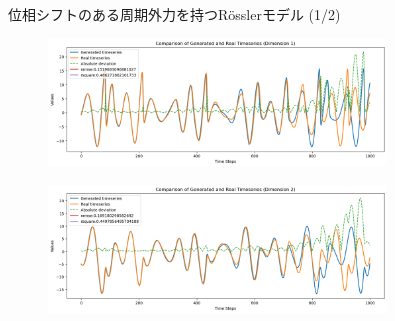 \begin{frame}{位相シフトのある周期外力を持つRösslerモデル (1/2)}    
    \begin{minipage}{0.49\textwidth}
    \vspace*{-.5cm}
        \begin{figure}
            \includegraphics[width=0.8\textwidth]{Fig/custard1.png}
            \label{custard1.png} %
        \end{figure}
        \vspace{-1.0cm}

        \begin{figure}
            \includegraphics[width=0.8\textwidth]{Fig/custard2.png}
            \label{custard2.png} %
        \end{figure}
        \vspace{-1.0cm}


\end{minipage}
\end{frame}

